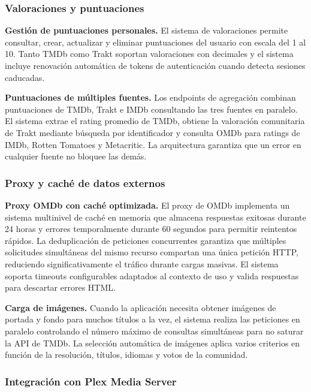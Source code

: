 \subsubsection{Valoraciones y puntuaciones}

\textbf{Gestión de puntuaciones personales.} El sistema de valoraciones permite consultar, crear, actualizar y eliminar puntuaciones del usuario con escala del 1 al 10. Tanto TMDb como Trakt soportan valoraciones con decimales y el sistema incluye renovación automática de tokens de autenticación cuando detecta sesiones caducadas.

\textbf{Puntuaciones de múltiples fuentes.} Los endpoints de agregación combinan puntuaciones de TMDb, Trakt e IMDb consultando las tres fuentes en paralelo. El sistema extrae el rating promedio de TMDb, obtiene la valoración comunitaria de Trakt mediante búsqueda por identificador y consulta OMDb para ratings de IMDb, Rotten Tomatoes y Metacritic. La arquitectura garantiza que un error en cualquier fuente no bloquee las demás.

\subsubsection{Proxy y caché de datos externos}

\textbf{Proxy OMDb con caché optimizada.} El proxy de OMDb implementa un sistema multinivel de caché en memoria que almacena respuestas exitosas durante 24 horas y errores temporalmente durante 60 segundos para permitir reintentos rápidos. La deduplicación de peticiones concurrentes garantiza que múltiples solicitudes simultáneas del mismo recurso compartan una única petición HTTP, reduciendo significativamente el tráfico durante cargas masivas. El sistema soporta timeouts configurables adaptados al contexto de uso y valida respuestas para descartar errores HTML.

\textbf{Carga de imágenes.} Cuando la aplicación necesita obtener imágenes de portada y fondo para muchos títulos a la vez, el sistema realiza las peticiones en paralelo controlando el número máximo de consultas simultáneas para no saturar la API de TMDb. La selección automática de imágenes aplica varios criterios en función de la resolución, títulos, idiomas y votos de la comunidad.

\subsubsection{Integración con Plex Media Server}

